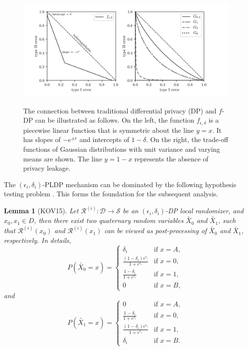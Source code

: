 \documentclass[letterpaper]{article} %
\newtheorem{lemma}{Lemma}
\begin{document}
\begin{figure}
  \centering
  \includegraphics[scale = 0.12]{picture/fDPVsDP.jpg}\\
  \caption{The connection between traditional differential privacy (DP) and $f$-DP can be illustrated as follows. On the left, the function $f_{\epsilon,\delta}$ is a piecewise linear function that is symmetric about the line $y=x$. It has slopes of $-e^{\pm \epsilon}$ and intercepts of $1-\delta$. On the right, the trade-off functions of Gaussian distributions with unit variance and varying means are shown. The line $y=1-x$ represents the absence of privacy leakage.  }\label{Fig:fDPVsDP}
\end{figure}

The $(\epsilon_i,\delta_i)$-PLDP mechanism can be dominated by the following hypothesis testing problem \cite{Kairouz2015composition}. This forms the foundation for the subsequent analysis.
\begin{lemma}[KOV15]\label{DPtransform}
Let $\mathcal{R}^{(i)}: \mathcal{D} \rightarrow \mathcal{S}$ be an $(\epsilon_i, \delta_i)$-DP local randomizer,
and $x_0,x_1 \in D$, then there exist two quaternary random variables $\tilde{X_0}$ and $\tilde{X_1}$, such that
$\mathcal{R}^{(i)}(x_0)$ and $\mathcal{R}^{(i)}(x_1)$ can be viewed as post-processing of $\tilde{X_0}$ and $\tilde{X_1}$, respectively.
In details,
$$
P(\tilde{X_0}=x) = \left\{
    \begin{array}{ll}
        \delta_i & \mbox{if } x=A, \\
        \frac{(1-\delta_i)e^{\epsilon_i}}{1+e^{\epsilon_i}} & \mbox{if } x = 0, \\
        \frac{1-\delta_i}{1+e^{\epsilon_i}} & \mbox{if } x = 1, \\
        0 & \mbox{if } x = B,
    \end{array}
\right.
$$
and
$$
P(\tilde{X_1}=x) = \left\{
    \begin{array}{ll}
        0 & \mbox{if } x=A, \\
        \frac{1-\delta_i}{1+e^{\epsilon_i}} & \mbox{if } x = 0, \\
        \frac{(1-\delta_i)e^{\epsilon_i}}{1+e^{\epsilon_i}} & \mbox{if } x = 1, \\
        \delta_i & \mbox{if } x = B.
    \end{array}
\right.
$$
\end{lemma}
\end{document}
